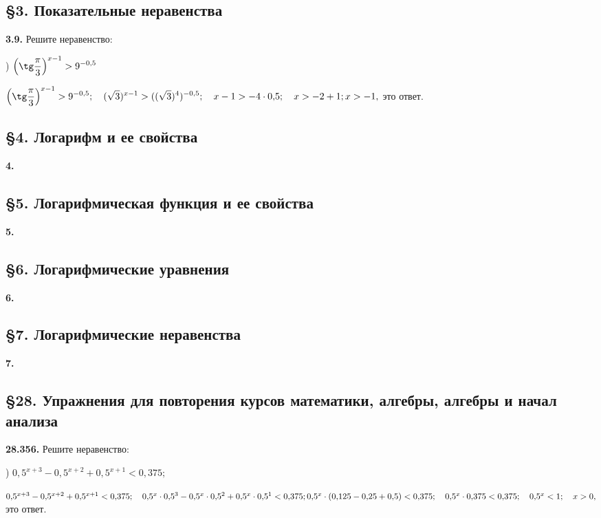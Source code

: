 \documentclass[a5paper,10pt]{article}
\begin{document}
\subsection* {\S 3. Показательные неравенства}

{\bf 3.9.}  Решите неравенство:

\medskip
{}) $\displaystyle \left(\tg\frac{\pi}{3}\right)^{x-1}>9^{-0{,}5}$

\medskip
\noindent
$\displaystyle \left(\tg\frac{\pi}{3}\right)^{x-1}>9^{-0{,}5};\quad
(\sqrt3)^{x-1}>((\sqrt3)^4)^{-0{,}5};\quad x-1>-4\cdot0{,}5;\quad x>-2+1;\\[3pt]
x>-1,$ это ответ.

\subsection* {\S 4. Логарифм и ее свойства}

{\bf 4.}

\subsection* {\S 5. Логарифмическая функция и ее свойства}

{\bf 5.}

\subsection* {\S 6. Логарифмические уравнения}

{\bf 6.}

\subsection* {\S 7. Логарифмические неравенства}

{\bf 7.}

\subsection* {\S 28. Упражнения для повторения курсов математики, алгебры, алгебры и начал анализа}

{\bf 28.356.}  Решите неравенство:

\medskip
{}) $0{,}5^{x+3}-0{,}5^{x+2}+0{,}5^{x+1}<0{,}375;$

\medskip
\noindent
$0{,}5^{x+3}-0{,}5^{x+2}+0{,}5^{x+1}<0{,}375;\quad
0{,}5^{x}\cdot0{,}5^3-0{,}5^{x}\cdot0{,}5^2+0{,}5^{x}\cdot0{,}5^1<0{,}375;\\
0{,}5^{x}\cdot(0{,}125-0{,}25+0{,}5)<0{,}375;\quad0{,}5^{x}\cdot0{,}375<0{,}375;\quad
0{,}5^{x}<1;\quad x>0,$ это ответ.
\end{document}
